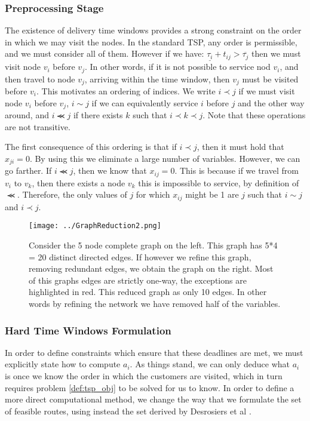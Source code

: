 \subsubsection{Preprocessing Stage}
\label{sec:DWPreprocess}
The existence of delivery time windows provides a strong constraint on the order in which we may visit the nodes. In the standard TSP, any order is permissible, and we must consider all of them. However if we have: $\underline{\tau_i}+t_{ij} > \overline{\tau_j}$ then we must visit node $v_i$ before $v_j$. In other words, if it is not possible to service nod $v_i$, and then travel to node $v_j$, arriving within the time window, then $v_j$ must be visited before $v_i$. This motivates an ordering of indices. We write $i  \prec j$ if we must visit node $v_i$ before $v_j$, $i \sim j$ if we can equivalently service $i$ before $j$ and the other way around, and $i \llcurly j$ if there exists $k$ such that $i \prec k \prec j$. Note that these operations are not transitive.

The first consequence of this ordering is that if $i \prec j$, then it must hold that $x_{ji}=0$. By using this we eliminate a large number of variables. However, we can go farther. If $i \llcurly j$, then we know that $x_{ij}=0$. This is because if we travel from $v_i$ to $v_k$, then there exists a node $v_k$ this is impossible to service, by definition of $\llcurly$. Therefore, the only values of $j$ for which $x_{ij}$ might be 1 are $j$ such that $i\sim j$ and $i \prec j$.

\begin{figure}
	\texttt{[image: ../GraphReduction2.png]}
	\caption{Consider the 5 node complete graph on the left. This graph has 5*4 = 20 distinct directed edges. If however we refine this graph, removing redundant edges, we obtain the graph on the right. Most of this graphs edges are strictly one-way, the exceptions are highlighted in red. This reduced graph as only 10 edges. In other words by refining the network we have removed half of the variables.}
	\label{fig:GraphRefinement2}
\end{figure}

\subsubsection{Hard Time Windows Formulation}

In order to define constraints which ensure that these deadlines are met, we must explicitly state how to compute $a_i$. As things stand, we can only deduce what $a_i$ is once we know the order in which the customers are visited, which in turn requires problem \ref{def:tsp_obj} to be solved for us to know. In order to define a more direct computational method, we change the way that we formulate the set of feasible routes, using instead the set derived by Desrosiers et al \cite{desrosiers1983plus}.

